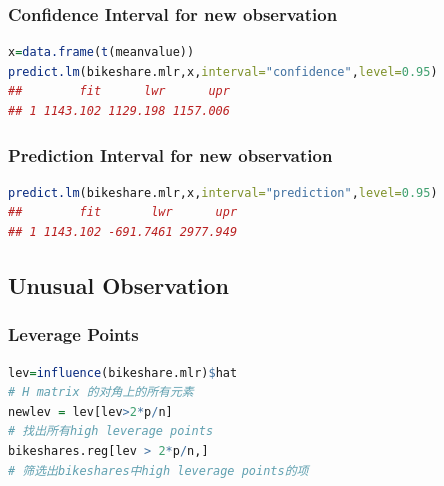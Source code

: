 \documentclass[11pt,a4paper]{article}
\begin{document}
\subsubsection{Confidence Interval for new observation}
\begin{lstlisting}[language=R]
x=data.frame(t(meanvalue))
predict.lm(bikeshare.mlr,x,interval="confidence",level=0.95)
##        fit      lwr      upr
## 1 1143.102 1129.198 1157.006
\end{lstlisting}
\subsubsection{Prediction Interval for new observation}
\begin{lstlisting}[language=R]
predict.lm(bikeshare.mlr,x,interval="prediction",level=0.95)
##        fit       lwr      upr
## 1 1143.102 -691.7461 2977.949
\end{lstlisting}

\subsection{Unusual Observation}
\subsubsection{Leverage Points}
\begin{lstlisting}[language=R]
lev=influence(bikeshare.mlr)$hat
# H matrix 的对角上的所有元素
newlev = lev[lev>2*p/n]
# 找出所有high leverage points
bikeshares.reg[lev > 2*p/n,]
# 筛选出bikeshares中high leverage points的项
\end{lstlisting}
\end{document}
